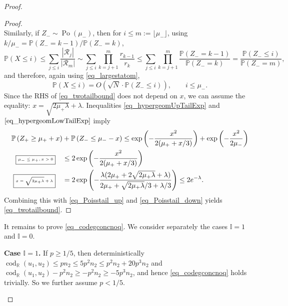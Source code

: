 \documentclass[12pt,reqno]{amsart}
\newcommand{\rc}{{\mathcal{R}}}
\newcommand{\Prob} {\mathbb {P}}
\newcommand{\prob}[1]{\Prob\left(#1\right)}
\newcommand{\R} {\mathbb R}
\newcommand{\I} {\mathbb I}
\newcommand{\Po}{\operatorname{Po}}
\newcommand{\cod}{\operatorname{cod}}
\theoremstyle{definition}
\newcommand{\justify}[1]{\fbox{\tiny{#1}}\quad}
\newcommand{\rhs}{RHS}
\begin{document}
\begin{proof}
\begin{proof}
\begin{equation}
	  \end{equation}
	  Similarly, if $Z_- \sim \Po(\mu_-)$, then for $i\le m := \lfloor \mu_- \rfloor$, using $k/\mu_- = \prob{Z_- = k-1}/\prob{Z_- = k}$,
	  \begin{equation*}
	    \prob{X \le i}\le \sum_{j \le i} \frac{|\rc_j|}{|\rc_{m}|} \sim \sum_{j \le i}\prod_{k = j + 1}^{ m} \frac{r_{k-1}}{r_{k}} \le \sum_{j \le i}\prod_{k = j + 1}^{ m} \frac{\prob{Z_- = k-1}}{\prob{Z_- = k}} = \frac{\prob{Z_- \le i}}{\prob{Z_- = m}},
	  \end{equation*}
	  and therefore, again using \eqref{eq_largestatom},
	  \begin{equation}
	    \label{eq_Poisstail_down}
	    \prob{X \le i} = O\left( \sqrt{N} \cdot \prob{Z_- \le i} \right), \qquad i \le \mu_-.
	  \end{equation}
	  Since the \rhs{} of \eqref{eq_twotailbound} does not depend on $x$, we can assume the equality: $x = \sqrt{2\mu_+\lambda} + \lambda$. Inequalities \eqref{eq_hypergeomUpTailExp} and $\eqref{eq_hypergeomLowTailExp}$ imply
	  \begin{equation*}
	    \begin{split}
	      \prob{Z_+ \ge \mu_+ + x} &+ \prob{Z_- \le \mu_- - x} \le \exp \left( - \frac{x^2}{2(\mu_+ + x/3)} \right) + \exp \left( -\frac{x^2}{2\mu_-} \right) \\
	      \justify{$\mu_- \le \mu_+, x > 0$} &\le 2 \exp \left( -\frac{x^2}{2(\mu_+ + x/3)} \right) \\
	      \justify{$x = \sqrt{2 \mu_+ \lambda} + \lambda$} &= 2 \exp \left( -\frac{\lambda(2\mu_+ + 2\sqrt{2\mu_+ \lambda} + \lambda)}{2\mu_+ + \sqrt{2\mu_+ \lambda}/3 + \lambda/3} \right) \le 2e^{-\lambda}.
	    \end{split}
	  \end{equation*}
	  Combining this with \eqref{eq_Poisstail_up} and \eqref{eq_Poisstail_down} yields \eqref{eq_twotailbound}.
	\end{proof}

	It remains to prove \eqref{eq_codegconcnoq}. We consider separately the cases $\I = 1$ and $\I = 0$.

\smallskip
	
	\textbf{Case $\I = 1$.}
	If $p \ge 1/5$, then deterministically
	$\cod_\R(u_1,u_2) \le pn_2\le 5p^2n_2 \le p^2 n_2 + 20 p^3 n_2$ and $\cod_\R(u_1, u_2) - p^2 n_2 \ge - p^2 n_2 \ge -5p^3 n_2$, and hence \eqref{eq_codegconcnoq} holds trivially. So we further assume $p < 1/5$.


\begin{figure}
\begin{center}
\end{center}
\end{figure}
\end{proof}
\end{document}
